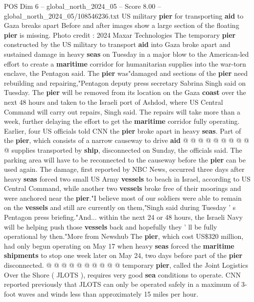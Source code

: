 \begin{textsample}{POS Dim 6 – global\_north\_2024\_05 – Score 8.00 – global\_north\_2024\_05/108546236.txt}  \label{ex:f6_pos_150}
US military \textbf{pier} for transporting \textbf{aid} to Gaza breaks apart Before and after images show a large section of the floating \textbf{pier} is missing.
Photo credit : 2024 Maxar Technologies The temporary \textbf{pier} constructed by the US military to transport \textbf{aid} into Gaza broke apart and sustained damage in heavy \textbf{seas} on Tuesday in a major blow to the American-led effort to create a \textbf{maritime} corridor for humanitarian supplies into the war-torn enclave, the Pentagon said.
The \textbf{pier} was"damaged and sections of the \textbf{pier} need rebuilding and repairing,"Pentagon deputy press secretary Sabrina Singh said on Tuesday.
The \textbf{pier} will be removed from its location on the Gaza \textbf{coast} over the next 48 hours and taken to the Israeli port of Ashdod, where US Central Command will carry out repairs, Singh said.
The repairs will take more than a week, further delaying the effort to get the \textbf{maritime} corridor fully operating.
Earlier, four US officials told CNN the \textbf{pier} broke apart in heavy \textbf{seas}.
Part of the \textbf{pier}, which consists of a narrow causeway to drive \textbf{aid} @ @ @ @ @ @ @ @ @ @ supplies transported by \textbf{ship}, disconnected on Sunday, the officials said.
The parking area will have to be reconnected to the causeway before the \textbf{pier} can be used again.
The damage, first reported by NBC News, occurred three days after heavy \textbf{seas} forced two small US Army \textbf{vessels} to beach in Israel, according to US Central Command, while another two \textbf{vessels} broke free of their moorings and were anchored near the \textbf{pier}."I believe most of our soldiers were able to remain on the \textbf{vessels} and still are currently on them,"Singh said during Tuesday ' s Pentagon press briefing."And... within the next 24 or 48 hours, the Israeli Navy will be helping push those \textbf{vessels} back and hopefully they ' ll be fully operational by then."More from Newshub The \textbf{pier}, which cost US\$320 million, had only begun operating on May 17 when heavy \textbf{seas} forced the \textbf{maritime} \textbf{shipments} to stop one week later on May 24, two days before part of the \textbf{pier} disconnected. @ @ @ @ @ @ @ @ @ @ temporary \textbf{pier}, called the Joint Logistics Over the Shore ( JLOTS ), requires very good \textbf{sea} conditions to operate.
CNN reported previously that JLOTS can only be operated safely in a maximum of 3-foot waves and winds less than approximately 15 miles per hour.

\end{textsample}
